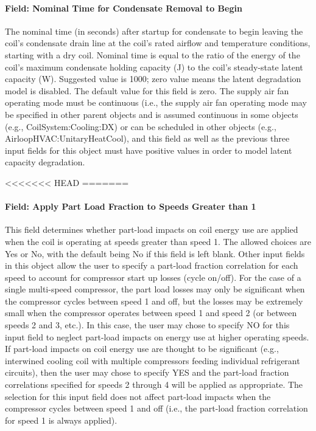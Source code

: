 \paragraph{Field: Nominal Time for Condensate Removal to Begin}

The nominal time (in seconds) after startup for condensate to begin leaving the coil's condensate drain line at the coil's rated airflow and temperature conditions, starting with a dry coil. Nominal time is equal to the ratio of the energy of the coil's maximum condensate holding capacity (J) to the coil's steady-state latent capacity (W). Suggested value is 1000; zero value means the latent degradation model is disabled. The default value for this field is zero. The supply air fan operating mode must be continuous (i.e., the supply air fan operating mode may be specified in other parent objects and is assumed continuous in some objects (e.g., CoilSystem:Cooling:DX) or can be scheduled in other objects (e.g., AirloopHVAC:UnitaryHeatCool), and this field as well as the previous three input fields for this object must have positive values in order to model latent capacity degradation.

<<<<<<< HEAD
=======
\paragraph{Field: Apply Part Load Fraction to Speeds Greater than 1}

This field determines whether part-load impacts on coil energy use are applied when the coil is operating at speeds greater than speed 1. The allowed choices are Yes or No, with the default being No if this field is left blank. Other input fields in this object allow the user to specify a part-load fraction correlation for each speed to account for compressor start up losses (cycle on/off). For the case of a single multi-speed compressor, the part load losses may only be significant when the compressor cycles between speed 1 and off, but the losses may be extremely small when the compressor operates between speed 1 and speed 2 (or between speeds 2 and 3, etc.). In this case, the user may chose to specify NO for this input field to neglect part-load impacts on energy use at higher operating speeds. If part-load impacts on coil energy use are thought to be significant (e.g., interwined cooling coil with multiple compressors feeding individual refrigerant circuits), then the user may chose to specify YES and the part-load fraction correlations specified for speeds 2 through 4 will be applied as appropriate. The selection for this input field does not affect part-load impacts when the compressor cycles between speed 1 and off (i.e., the part-load fraction correlation for speed 1 is always applied).

